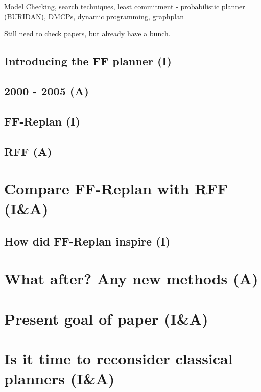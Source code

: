 \documentclass[runningheads,a4paper]{llncs}
\begin{document}
Model Checking, search techniques, least commitment - probabilistic planner (BURIDAN), DMCPs, dynamic programming, graphplan

Still need to check papers, but already have a bunch.


\subsection{Introducing the FF planner (I)}

\subsection{2000 - 2005 (A)}

\subsection{FF-Replan (I)}

\subsection{RFF (A)}

\section{Compare FF-Replan with RFF (I\&A)}

\subsection{How did FF-Replan inspire (I)}

\section{What after? Any new methods (A)}

\section{Present goal of paper (I\&A)}

\section{Is it time to reconsider classical planners (I\&A)}



\end{document}
